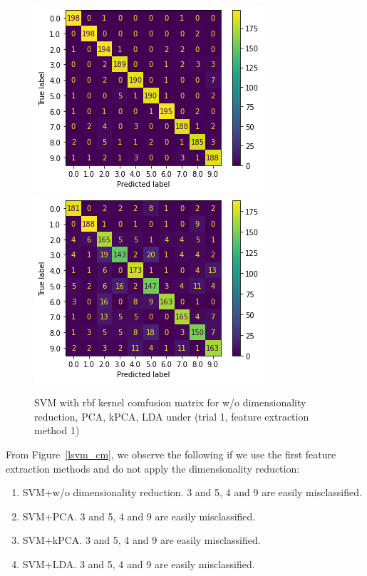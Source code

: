 \documentclass{article}
\begin{document}
\begin{figure}[!htb]
  \includegraphics[width=\linewidth]{figure/ksvm_kpca_cm.png}
\endminipage\hfill
{}
  \includegraphics[width=\linewidth]{figure/ksvm_lda_cm.png}
\endminipage
\caption{SVM with rbf kernel comfusion matrix for w/o dimensionality reduction, PCA, kPCA, LDA under (trial 1, feature extraction method 1)}
\label{ksvm_cm}
\end{figure}

From Figure~\ref{lsvm_cm}, we observe the following if we use the first feature extraction methods and do not apply the dimensionality reduction:
\begin{enumerate}
    \item SVM+w/o dimensionality reduction. 3 and 5, 4 and 9 are easily misclassified.
    \item SVM+PCA. 3 and 5, 4 and 9 are easily misclassified.
    \item SVM+kPCA. 3 and 5, 4 and 9 are easily misclassified.
    \item SVM+LDA. 3 and 5, 4 and 9 are easily misclassified.
\end{enumerate}
\end{document}
